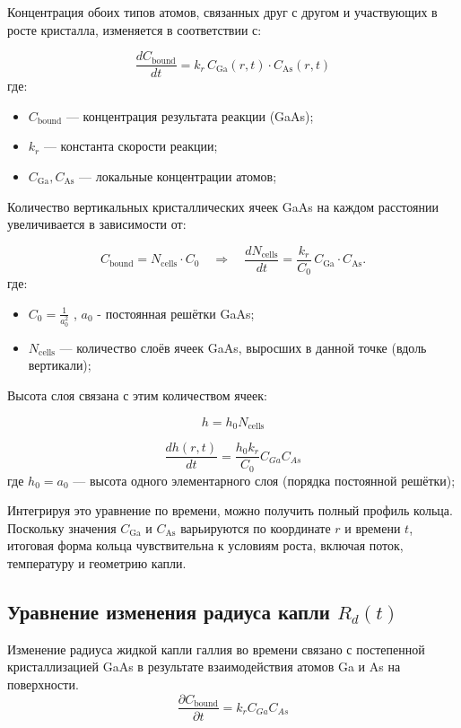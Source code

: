 \documentclass[14pt,oneside]{extarticle}
\begin{document}
Концентрация обоих типов атомов, связанных друг с другом и участвующих в росте кристалла, изменяется в соответствии с:

\[
\frac{dC_{\text{bound}}}{dt} = k_r \, C_{\text{Ga}}(r,t) \cdot C_{\text{As}}(r,t)
\]
где:
\begin{itemize}
  \item $C_{\text{bound}}$ — концентрация результата реакции (GaAs);
  \item $k_r$ — константа скорости реакции;
  \item $C_{\text{Ga}}, C_{\text{As}}$ — локальные концентрации атомов;
\end{itemize}

Количество вертикальных кристаллических ячеек GaAs на каждом расстоянии увеличивается в зависимости от:

\[
C_{\text{bound}} = N_{\text{cells}} \cdot C_0 \quad \Rightarrow \quad
\frac{dN_{\text{cells}}}{dt} = \frac{k_r}{C_0} \, C_{\text{Ga}} \cdot C_{\text{As}}.
\]
где:
\begin{itemize}
  \item $C_0 = \frac{1}{a_0^2}$ , $a_0$ - постоянная решётки GaAs;
  \item $N_{\text{cells}}$ — количество слоёв ячеек GaAs, выросших в данной точке (вдоль вертикали);
\end{itemize}

Высота слоя связана с этим количеством ячеек:

\[
    h=h_{0}N_{\text{cells}}
\]

\[
\frac{dh\left(r,t\right)}{dt}=\frac{h_{0}k_{r}}{C_{0}}C_{Ga}C_{As}
\]
где $h_0=a_0$ — высота одного элементарного слоя (порядка постоянной решётки);

Интегрируя это уравнение по времени, можно получить полный профиль кольца. Поскольку значения $C_{\text{Ga}}$ и $C_{\text{As}}$ варьируются по координате $r$ и времени $t$, итоговая форма кольца чувствительна к условиям роста, включая поток, температуру и геометрию капли.

\subsection{Уравнение изменения радиуса капли \texorpdfstring{$R_d(t)$}{Rd(t)}}

Изменение радиуса жидкой капли галлия во времени связано с постепенной кристаллизацией GaAs в результате взаимодействия атомов Ga и As на поверхности.
\begin{equation}
\frac{\partial C_{\text{bound}}}{\partial t}=k_{r}C_{Ga}C_{As}
\end{equation}
\end{document}
